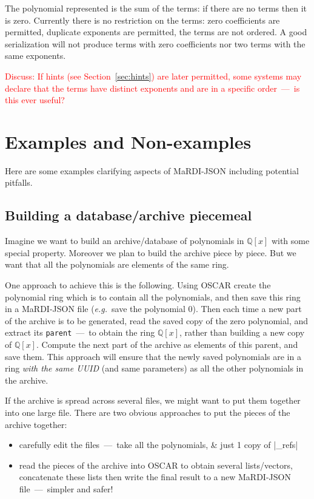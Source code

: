 \documentclass{article}
\newcommand{\blueverb}{\collectverb{\color{blue}\colorbox{gray!20}}}
\newcommand{\MaRDIJSON}{MaRDI-JSON}
\newcommand \eg {\textit{e.g.}}
\newcommand \QQ {{\mathbb Q}}
\def\red#1{\textcolor{red}{#1}}
\begin{document}
The polynomial represented is the sum of the terms: if there are no terms then it is zero.
Currently there is no restriction on the terms: zero coefficients are permitted,
duplicate exponents are permitted, the terms are not ordered.  A good serialization
will not produce terms with zero coefficients nor two terms with the same exponents.

\red{Discuss: If hints (see Section~\ref{sec:hints}) are later
  permitted, some systems may declare that the terms have distinct
  exponents and are in a specific order~---~is this ever useful?}



\section{Examples and Non-examples}
\label{sec:examples}

Here are some examples clarifying aspects of {\MaRDIJSON} including potential pitfalls.


\subsection{Building a database/archive piecemeal}

Imagine we want to build an archive/database of polynomials in $\QQ[x]$
with some special property.  Moreover we plan to build the archive piece
by piece.  But we want that all the polynomials are elements of the same
ring.

One approach to achieve this is the following.  Using OSCAR create the
polynomial ring which is to contain all the polynomials, and then save
this ring in a {\MaRDIJSON} file (\eg~save the polynomial $0$).  Then
each time a new part of the archive is to be generated, read the saved
copy of the zero polynomial, and extract its \verb|parent|~---~to obtain the ring $\QQ[x]$, rather than building a new copy of $\QQ[x]$.  Compute
the next part of the archive as elements of this parent, and save them.
This approach will ensure that the newly saved polynomials are in a
ring \textit{with the same UUID} (and same parameters) as all the
other polynomials in the archive.

If the archive is spread across several files, we might want to put
them together into one large file.  There are two obvious approaches
to put the pieces of the archive together:
\begin{itemize}
\item carefully edit the files~---~take all the polynomials, {\&} just 1 copy of \blueverb|_refs|
\item read the pieces of the archive into OSCAR to obtain several
  lists/vectors, concatenate these lists then write the final result
  to a new {\MaRDIJSON} file~---~simpler and safer!
\end{itemize}
\end{document}

